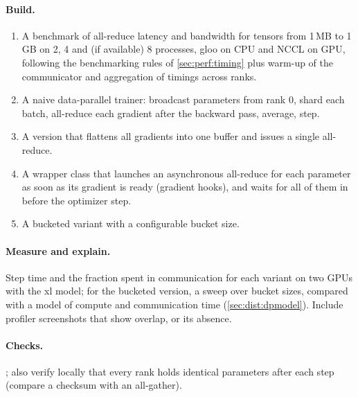 \paragraph{Build.}
\begin{enumerate}
\item A benchmark of all-reduce latency and bandwidth for tensors from 1\,MB to 1\,GB on 2, 4 and (if
  available) 8 processes, gloo on CPU and NCCL on GPU, following the benchmarking rules of
  \cref{sec:perf:timing} plus warm-up of the communicator and aggregation of timings across ranks.
\item A naive data-parallel trainer: broadcast parameters from rank 0, shard each batch, all-reduce
  each gradient after the backward pass, average, step.
\item A version that flattens all gradients into one buffer and issues a single all-reduce.
\item A wrapper class that launches an asynchronous all-reduce for each parameter as soon as its
  gradient is ready (gradient hooks), and waits for all of them in  before the
  optimizer step.
\item A bucketed variant with a configurable bucket size.
\end{enumerate}

\paragraph{Measure and explain.} Step time and the fraction spent in communication for each variant
on two GPUs with the xl model; for the bucketed version, a sweep over bucket sizes, compared with a
model of compute and communication time (\cref{sec:dist:dpmodel}). Include profiler screenshots that
show overlap, or its absence.

\paragraph{Checks.} ; also verify locally that every rank holds identical
parameters after each step (compare a checksum with an all-gather).

